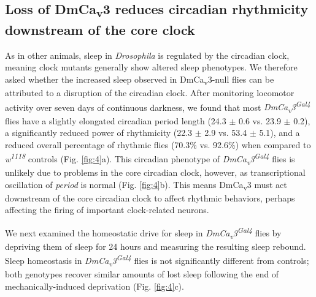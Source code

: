 \subsection*{Loss of DmCa\textsubscript{v}3 reduces circadian rhythmicity downstream of the core clock}

As in other animals, sleep in \emph{Drosophila} is regulated by the circadian clock, meaning clock mutants generally show altered sleep phenotypes\cite{hendricks:2003aa, parisky:2008aa}.
We therefore asked whether the increased sleep observed in DmCa\textsubscript{v}3-null flies can be attributed to a disruption of the circadian clock.
After monitoring locomotor activity over seven days of continuous darkness, we found that most \emph{DmCa\textsubscript{v}3\textsuperscript{Gal4}} flies have a slightly elongated circadian period length (24.3 $\pm$ 0.6 vs. 23.9 $\pm$ 0.2), a significantly reduced power of rhythmicity (22.3 $\pm$ 2.9 vs. 53.4 $\pm$ 5.1), and a reduced overall percentage of rhythmic flies (70.3\% vs. 92.6\%) when compared to \emph{w\textsuperscript{1118}} controls (Fig. \ref{fig:4}a).
This circadian phenotype of \emph{DmCa\textsubscript{v}3\textsuperscript{Gal4}} flies is unlikely due to problems in the core circadian clock, however, as transcriptional oscillation of \emph{period} is normal (Fig. \ref{fig:4}b).
This means DmCa\textsubscript{v}3 must act downstream of the core circadian clock to affect rhythmic behaviors, perhaps affecting the firing of important clock-related neurons.

We next examined the homeostatic drive for sleep in \emph{DmCa\textsubscript{v}3\textsuperscript{Gal4}} flies by depriving them of sleep for 24 hours and measuring the resulting sleep rebound. Sleep homeostasis in \emph{DmCa\textsubscript{v}3\textsuperscript{Gal4}} flies is not significantly different from controls; both genotypes recover similar amounts of lost sleep following the end of mechanically-induced deprivation (Fig. \ref{fig:4}c).
